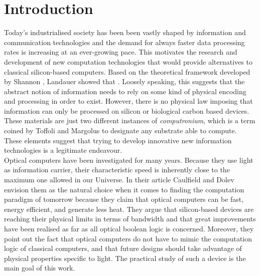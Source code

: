 \chapter{Introduction}
\label{introduction}

Today's industrialised society has been been vastly shaped by information and communication technologies and the demand for always faster data processing rates is increasing at an ever-growing pace. This motivates the research and development of new computation technologies that would provide alternatives to classical silicon-based computers. Based on the theoretical framework developed by Shannon \cite{shannon1948mathematical}, Landauer showed that  \cite{Landauer1991}. Loosely speaking, this suggests that the abstract notion of information needs to rely on some kind of physical encoding and processing in order to exist. However, there is no physical law imposing that information can only be processed on silicon or biological carbon based devices. These  materials are just two different instances of \textit{computronium}, which is a term coined by Toffoli and Margolus \cite{amato1991speculating} to designate any substrate able to compute. These elements suggest that trying to develop innovative new information technologies is a legitimate endeavour.\\

Optical computers have been investigated for many years. Because they use light as information carrier, their characteristic speed is inherently close to the maximum one allowed in our Universe. In their article \cite{Caulfield2010} Caulfield and Dolev envision them as the natural choice when it comes to finding the computation paradigm of tomorrow because they claim that optical computers can be fast, energy efficient, and generate less heat. They argue that silicon-based devices are reaching their physical limits in terms of bandwidth and that great improvements have been realised as far as all optical boolean logic is concerned. Moreover, they point out the fact that optical computers do not have to mimic the computation logic of classical computers, and that future designs should take advantage of physical properties specific to light. The practical study of such a device is the main goal of this work.\\

